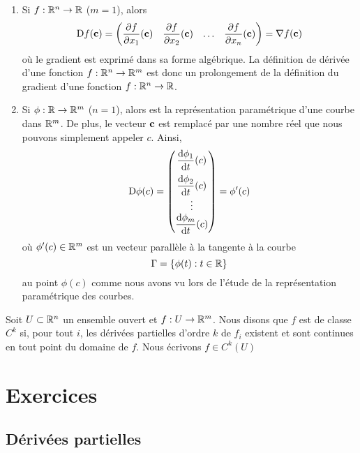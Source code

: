 {\begin{rmkList}
\begin{enumerate}
\item Si $f:\mathbb{R}^n\rightarrow \mathbb{R}$ ($m=1$), alors
\[
\mathrm{D} f(\mathbf{c}) =
\begin{pmatrix}
\displaystyle \frac{\partial f}{\partial x_1}(\mathbf{c}) &
\displaystyle \frac{\partial f}{\partial x_2}(\mathbf{c}) & \ldots &
\displaystyle \frac{\partial f}{\partial x_n}(\mathbf{c})
\end{pmatrix}
= \nabla f(\mathbf{c})
\]
où le gradient est exprimé dans sa forme algébrique.
La définition de dérivée d'une fonction $f:\mathbb{R}^n\rightarrow \mathbb{R}^m$ est
donc un prolongement de la définition du gradient d'une fonction
$f:\mathbb{R}^n\rightarrow \mathbb{R}$.
\item Si $\phi:\mathbb{R}\rightarrow \mathbb{R}^m$ ($n=1$), alors
est la représentation paramétrique d'une courbe dans $\mathbb{R}^m$.  De
plus, le vecteur $\mathbf{c}$ est remplacé par une nombre réel que nous pouvons
simplement appeler $c$.  Ainsi,
\[
\mathrm{D} \phi(c) =
\begin{pmatrix}
\displaystyle \frac{\mathrm{d}\phi_1}{\mathrm{d}t}(c) \\[2ex]
\displaystyle \frac{\mathrm{d}\phi_2}{\mathrm{d}t}(c) \\ \vdots \\
\displaystyle \frac{\mathrm{d}\phi_m}{\mathrm{d}t}(c)
\end{pmatrix}
= \phi'(c)
\]
où $\phi'(c) \in \mathbb{R}^m$ est un vecteur parallèle à la tangente à la
courbe
\[
\Gamma = \{ \phi(t) : t \in \mathbb{R} \}
\]
au point $\phi(c)$ comme nous avons vu lors de l'étude de la représentation
paramétrique des courbes.
\end{enumerate}
\end{rmkList}

\begin{focus}{\dfn} 
Soit $U \subset \mathbb{R}^n$ un ensemble ouvert et $f:U \rightarrow \mathbb{R}^m$.
Nous disons que $f$ est de classe $C^k$ si, pour tout $i$, les dérivées
partielles d'ordre $k$ de $f_i$ existent et sont continues en tout
point du domaine de $f$.  Nous écrivons $f \in C^k(U)$
\end{focus}

}  %

\section{Exercices}

\subsection{Dérivées partielles}

